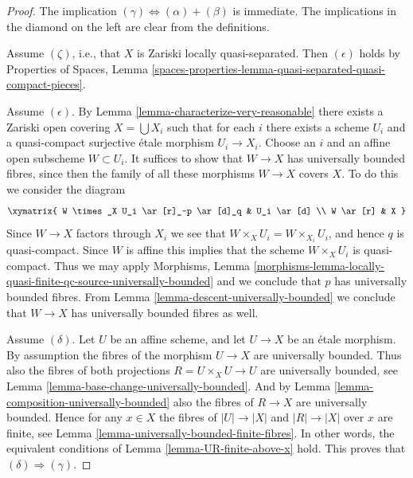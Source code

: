 \documentclass[10pt,a4paper]{amsart}
\theoremstyle{plain}
\theoremstyle{definition}
\theoremstyle{remark}
\numberwithin{equation}{subsection}
\begin{document}
\begin{proof}
The implication $(\gamma) \Leftrightarrow (\alpha) + (\beta)$ is immediate.
The implications in the diamond on the left are clear from the
definitions.

\medskip\noindent
Assume $(\zeta)$, i.e., that $X$ is Zariski locally quasi-separated.
Then $(\epsilon)$ holds by
Properties of Spaces, Lemma
\ref{spaces-properties-lemma-quasi-separated-quasi-compact-pieces}.

\medskip\noindent
Assume $(\epsilon)$. By
Lemma \ref{lemma-characterize-very-reasonable}
there exists
a Zariski open covering $X = \bigcup X_i$ such that for each $i$
there exists a scheme $U_i$ and a quasi-compact surjective \'etale morphism
$U_i \to X_i$. Choose an $i$ and an affine open subscheme $W \subset U_i$.
It suffices to show that $W \to X$ has universally bounded fibres, since then
the family of all these morphisms $W \to X$ covers $X$.
To do this we consider the diagram
$$
\xymatrix{
W \times_X U_i \ar[r]_-p \ar[d]_q & U_i \ar[d] \\
W \ar[r] & X
}
$$
Since $W \to X$ factors through $X_i$ we see that
$W \times_X U_i = W \times_{X_i} U_i$, and hence $q$ is quasi-compact.
Since $W$ is affine this implies that the scheme $W \times_X U_i$
is quasi-compact. Thus we may apply
Morphisms, Lemma
\ref{morphisms-lemma-locally-quasi-finite-qc-source-universally-bounded}
and we conclude that $p$ has universally bounded fibres. From
Lemma \ref{lemma-descent-universally-bounded}
we conclude that $W \to X$ has universally bounded fibres as well.

\medskip\noindent
Assume $(\delta)$. Let $U$ be an affine scheme, and let $U \to X$ be an \'etale
morphism. By assumption the fibres of the morphism $U \to X$ are universally
bounded. Thus also the fibres of both projections $R = U \times_X U \to U$
are universally bounded, see
Lemma \ref{lemma-base-change-universally-bounded}.
And by
Lemma \ref{lemma-composition-universally-bounded}
also the fibres of $R \to X$ are universally bounded.
Hence for any $x \in X$ the fibres of $|U| \to |X|$ and $|R| \to |X|$
over $x$ are finite, see
Lemma \ref{lemma-universally-bounded-finite-fibres}.
In other words, the equivalent conditions of
Lemma \ref{lemma-UR-finite-above-x}
hold. This proves that $(\delta) \Rightarrow (\gamma)$.
\end{proof}
\end{document}
